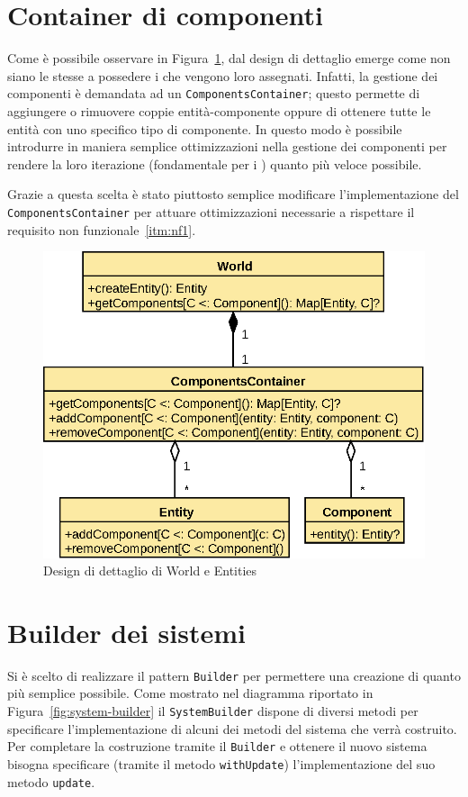 

\section{Container di componenti}\label{sec:container-di-componenti}
Come è possibile osservare in Figura~\ref{fig:world-detail}, dal design di dettaglio emerge come
non siano le \Entity stesse a possedere i \Component che vengono loro assegnati.
Infatti, la gestione dei componenti è demandata ad un \texttt{ComponentsContainer}; questo permette
di aggiungere o rimuovere coppie entità-componente oppure di ottenere tutte le entità con uno specifico tipo
di componente.
In questo modo è possibile introdurre in maniera semplice ottimizzazioni nella gestione dei
componenti per rendere la loro iterazione (fondamentale per i \System) quanto più veloce possibile.

Grazie a questa scelta è stato piuttosto semplice modificare l'implementazione del
\texttt{ComponentsContainer} per attuare ottimizzazioni
necessarie a rispettare il requisito non funzionale~\ref{itm:nf1}.
\begin{figure}
    \includegraphics{./img/WorldDetail}
    \caption{Design di dettaglio di World e Entities}
    \label{fig:world-detail}
\end{figure}

\section{Builder dei sistemi}\label{sec:builder-dei-sistemi}
Si è scelto di realizzare il pattern \texttt{Builder} per permettere una creazione di \System
quanto più semplice possibile.
Come mostrato nel diagramma riportato in Figura~\ref{fig:system-builder} il \texttt{SystemBuilder} dispone di diversi metodi per
specificare l'implementazione di alcuni dei metodi del sistema che verrà costruito.
Per completare la costruzione tramite il \texttt{Builder} e ottenere il nuovo sistema bisogna specificare
(tramite il metodo \texttt{withUpdate}) l'implementazione del suo metodo \texttt{update}.

